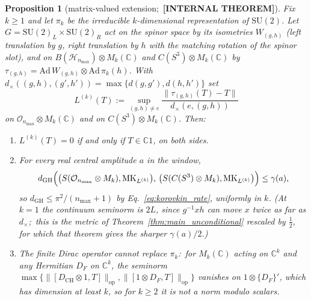 \documentclass[11pt,a4paper]{article}
\theoremstyle{plain}
\newtheorem{proposition}[theorem]{Proposition}
\theoremstyle{definition}
\newcommand{\nmax}{n_{\max}}
\newcommand{\sthree}{S^{3}}
\newcommand{\Hilb}{\mathcal{H}}
\newcommand{\Op}{\mathcal{O}}
\newcommand{\opnorm}[1]{\lVert #1 \rVert_{\mathrm{op}}}
\newcommand{\norm}[1]{\lVert #1 \rVert}
\newcommand{\C}{\mathbb{C}}
\newcommand{\SU}{\mathrm{SU}}
\newcommand{\DCH}{D_{\mathrm{CH}}}
\begin{document}
\begin{proposition}[matrix-valued extension;\ \textbf{[INTERNAL THEOREM]}]
\label{prop:matrix_extension}
Fix $k \ge 1$ and let $\pi_k$ be the irreducible $k$-dimensional
representation of $\SU(2)$. Let $G = \SU(2)_L \times \SU(2)_R$ act on
the spinor space by its isometries $W_{(g,h)}$ (left translation by $g$,
right translation by $h$ with the matching rotation of the spinor slot),
and on $B(\Hilb_{\nmax}) \otimes M_k(\C)$ and $C(\sthree) \otimes
M_k(\C)$ by
$\tau_{(g,h)} = \mathrm{Ad}\,W_{(g,h)} \otimes \mathrm{Ad}\,\pi_k(h)$.
With $d_\times((g,h),(g',h')) = \max\{d(g,g'), d(h,h')\}$ set
\begin{equation*}
L^{(k)}(T) := \sup_{(g,h) \ne e}
\frac{\norm{\tau_{(g,h)}(T) - T}}{d_\times(e,(g,h))}
\end{equation*}
on $\Op_{\nmax} \otimes M_k(\C)$ and on $C(\sthree) \otimes M_k(\C)$.
Then:
\begin{enumerate}\setlength{\itemsep}{1pt}
\item[(a)] $L^{(k)}(T) = 0$ if and only if $T \in \C 1$, on both sides.
\item[(b)] For every real central amplitude $a$ in the window,
\begin{equation*}
d_{\mathrm{GH}}\Bigl(\bigl(S(\Op_{\nmax} \otimes M_k),
\mathrm{MK}_{L^{(k)}}\bigr),\,
\bigl(S(C(\sthree) \otimes M_k), \mathrm{MK}_{L^{(k)}}\bigr)\Bigr)
\le \gamma(a),
\end{equation*}
so $d_{\mathrm{GH}} \le \pi^2/(\nmax+1)$ by Eq.~\eqref{eq:korovkin_rate},
uniformly in $k$. (At $k = 1$ the continuum seminorm is $2L$, since
$g^{-1} x h$ can move $x$ twice as far as $d_\times$;\ this is the
metric of Theorem~\ref{thm:main_unconditional} rescaled by $\tfrac12$,
for which that theorem gives the sharper $\gamma(a)/2$.)
\item[(c)] The finite Dirac operator cannot replace $\pi_k$:\ for
$M_k(\C)$ acting on $\C^k$ and any Hermitian $D_F$ on $\C^k$, the
seminorm $\max\{\opnorm{[\DCH \otimes 1, T]}, \opnorm{[1 \otimes D_F,
T]}\}$ vanishes on $1 \otimes \{D_F\}'$, which has dimension at least
$k$, so for $k \ge 2$ it is not a norm modulo scalars.
\end{enumerate}
\end{proposition}
\end{document}
